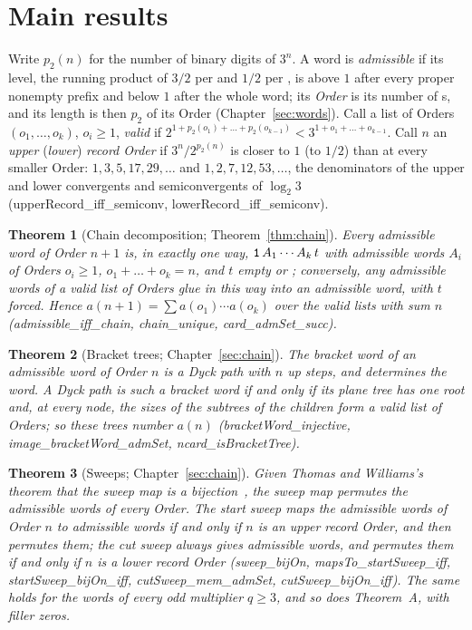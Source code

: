 \documentclass[10pt,a4paper,titlepage]{article}
\newcommand{\lean}[1]{\textsf{#1}}
\newtheorem{mainthm}{Theorem}
\begin{document}
\section*{Main results}

Write $p_2(n)$ for the number of binary digits of $3^n$. A word is \emph{admissible}
if its level, the running product of $3/2$ per  and $1/2$ per , is above
$1$ after every proper nonempty prefix and below $1$ after the whole word; its
\emph{Order} is its number of s, and its length is then $p_2$ of its Order
(Chapter~\ref{sec:words}). Call a list of Orders $(o_1, \dots, o_k)$, $o_i \ge 1$,
\emph{valid} if $2^{1 + p_2(o_1) + \dots + p_2(o_{k-1})} < 3^{1 + o_1 + \dots + o_{k-1}}$.
Call $n$ an \emph{upper} (\emph{lower}) \emph{record Order} if $3^n/2^{p_2(n)}$ is
closer to $1$ (to $1/2$) than at every smaller Order: $1, 3, 5, 17, 29, \dots$ and
$1, 2, 7, 12, 53, \dots$, the denominators of the upper and lower convergents and
semiconvergents of $\log_2 3$ (\lean{upperRecord\_iff\_semiconv},
\lean{lowerRecord\_iff\_semiconv}).

\begin{mainthm}[Chain decomposition; Theorem~\ref{thm:chain}]
Every admissible word of Order $n+1$ is, in exactly one way, $\text{\texttt{1}}\,A_1 \cdots A_k\,t$
with admissible words $A_i$ of Orders $o_i \ge 1$, $o_1 + \dots + o_k = n$, and $t$
empty or ; conversely, any admissible words of a valid list of Orders glue in this
way into an admissible word, with $t$ forced. Hence
$a(n+1) = \sum a(o_1) \cdots a(o_k)$ over the valid lists with sum $n$
(\lean{admissible\_iff\_chain}, \lean{chain\_unique}, \lean{card\_admSet\_succ}).
\end{mainthm}

\begin{mainthm}[Bracket trees; Chapter~\ref{sec:chain}]
The bracket word of an admissible word of Order $n$ is a Dyck path with $n$ up steps,
and determines the word. A Dyck path is such a bracket word if and only if its plane
tree has one root and, at every node, the sizes of the subtrees of the children form a
valid list of Orders; so these trees number $a(n)$ (\lean{bracketWord\_injective},
\lean{image\_bracketWord\_admSet}, \lean{ncard\_isBracketTree}).
\end{mainthm}

\begin{mainthm}[Sweeps; Chapter~\ref{sec:chain}]
Given Thomas and Williams's theorem that the sweep map is a bijection~\cite[Thm.~6.3]{ThomasWilliams2018},
the sweep map permutes the admissible words of every Order. The start sweep maps the
admissible words of Order $n$ to admissible words if and only if $n$ is an upper record
Order, and then permutes them; the cut sweep always gives admissible words, and permutes
them if and only if $n$ is a lower record Order (\lean{sweep\_bijOn},
\lean{mapsTo\_startSweep\_iff}, \lean{startSweep\_bijOn\_iff},
\lean{cutSweep\_mem\_admSet}, \lean{cutSweep\_bijOn\_iff}). The same holds for the
words of every odd multiplier $q \ge 3$, and so does Theorem~A, with filler zeros.
\end{mainthm}
\end{document}
